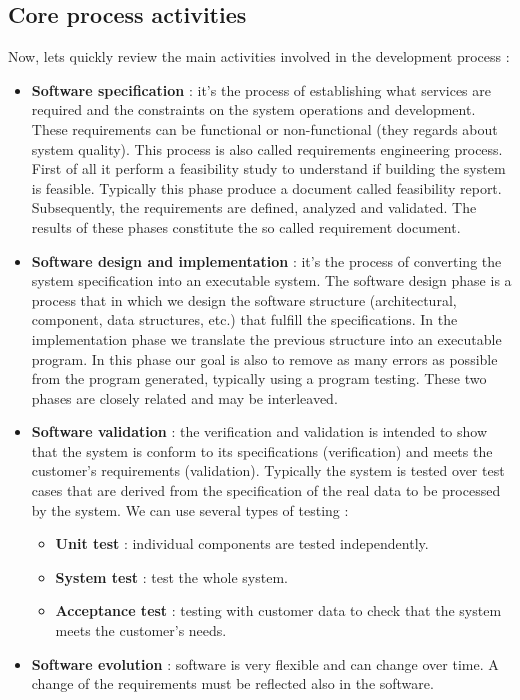 \subsection{Core process activities}
Now, lets quickly review the main activities involved in the development process :
\begin{itemize}
    \item \textbf{Software specification} : it's the process of establishing what services are required and the constraints on the system operations and development. These requirements can be functional or non-functional (they regards about system quality). This process is also called requirements engineering process. First of all it perform a feasibility study to understand if building the system is feasible. Typically this phase produce a document called feasibility report. Subsequently, the requirements are defined, analyzed and validated. The results of these phases constitute the so called requirement document.
    \item \textbf{Software design and implementation} : it's the process of converting the system specification into an executable system. The software design phase is a process that in which we design the software structure (architectural, component, data structures, etc.) that fulfill the specifications. In the implementation phase we translate the previous structure into an executable program. In this phase our goal is also to remove as many errors as possible from the program generated, typically using a program testing. These two phases are closely related and may be interleaved.
    \item \textbf{Software validation} : the verification and validation is intended to show that the system is conform to its specifications (verification) and meets the customer's requirements (validation). Typically the system is tested over test cases that are derived from the specification of the real data to be processed by the system. We can use several types of testing :
          \begin{itemize}
              \item \textbf{Unit test} : individual components are tested independently.
              \item \textbf{System test} : test the whole system.
              \item \textbf{Acceptance test} : testing with customer data to check that the system meets the customer's needs.
          \end{itemize}
    \item \textbf{Software evolution} : software is very flexible and can change over time. A change of the requirements must be reflected also in the software.
\end{itemize}
